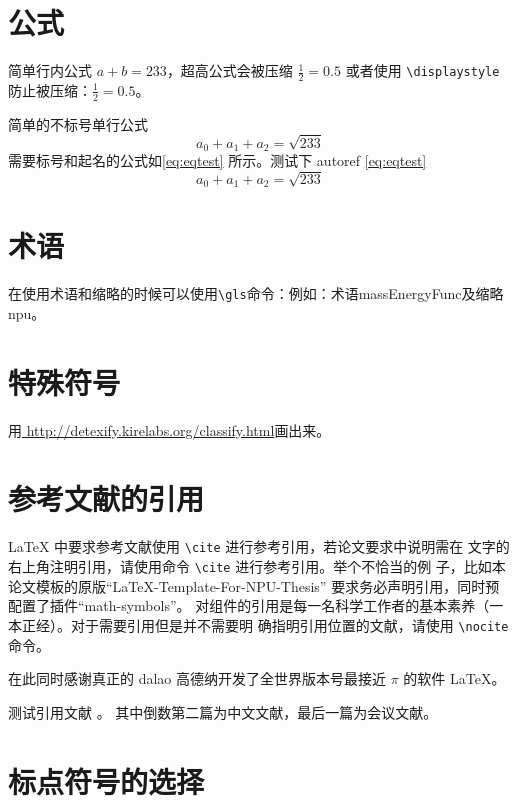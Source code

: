\documentclass[lang=chs, degree=phd, blindreview=false, winfonts=true, academic=true]{yanputhesis}
\begin{document}
\section{公式}
简单行内公式 $a+b=233$，超高公式会被压缩 $\frac{1}{2}=0.5$ 或者使用
\lstinline`\displaystyle` 防止被压缩：$\displaystyle \frac{1}{2}=0.5$。

简单的不标号单行公式
$$a_0+a_1+a_2=\sqrt{233}$$
需要标号和起名的公式如\autoref{eq:eqtest} 所示。测试下 autoref \autoref{eq:eqtest}
\begin{equation}
    \label{eq:eqtest}
    a_0 + a_1 + a_2 = \sqrt{233}
\end{equation}

\section{术语}

在使用术语和缩略的时候可以使用\lstinline`\gls`命令：例如：术语\gls{massEnergyFunc}及缩略\gls{npu}。

\section{特殊符号}

用\href{http://detexify.kirelabs.org/classify.html}{
    http://detexify.kirelabs.org/classify.html}画出来。

\section{参考文献的引用}

\LaTeX{} 中要求参考文献使用 \lstinline`\cite` 进行参考引用，若论文要求中说明需在
文字的右上角注明引用，请使用命令 \lstinline`\cite` 进行参考引用。举个不恰当的例
子，比如本论文模板的原版“LaTeX-Template-For-NPU-Thesis”\cite{NWPUThesisLaTeXTemplate}
要求务必声明引用，同时预配置了插件“math-symbols”\cite{MathSymbolsinLaTeXbypolossk}。
对组件的引用是每一名科学工作者的基本素养（一本正经）。对于需要引用但是并不需要明
确指明引用位置的文献，请使用 \lstinline`\nocite` 命令。

在此同时感谢真正的 dalao 高德纳开发了全世界版本号最接近 $\pi$ 的软件
\LaTeX \cite{knuth1986the}\nocite{lamport1989latex}。

测试引用文献 \cite{szegedy2015going, shen2021peridynamic, chen2014maiyuan, chen2018autonomous}。
其中倒数第二篇为中文文献，最后一篇为会议文献。

\section{标点符号的选择}
\end{document}
